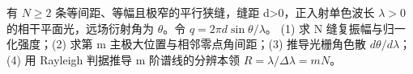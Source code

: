 有 \(N\ge 2\) 条等间距、等幅且极窄的平行狭缝，缝距 d>0，正入射单色波长 \(\lambda >0\) 的相干平面光，远场衍射角为 \(\theta \)。令 \(q=2\pi d\sin\theta/\lambda\)。
(1) 求 N 缝复振幅与归一化强度；(2) 求第 m 主极大位置与相邻零点角间距；(3) 推导光栅角色散 \(d\theta/d\lambda\)；(4) 用 Rayleigh 判据推导 m 阶谱线的分辨本领 \(R=\lambda/\Delta\lambda=mN\)。
